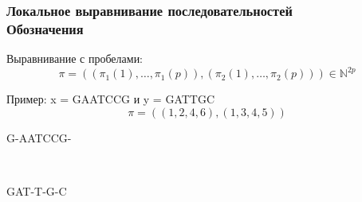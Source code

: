 

\begin{frame}
\frametitle{Локальное выравнивание последовательностей\\
Обозначения}
Выравнивание с пробелами:
\begin{equation*}
    \pi = ((\pi_1(1), \dots, \pi_1(p)),(\pi_2(1), \dots, \pi_2(p)))
    \in \mathbb{N}^{2p}
\end{equation*}

Пример: x = GAATCCG и y = GATTGC
\begin{equation*}
    \pi = ((1,2,4,6),(1,3,4,5))
\end{equation*}
\centerline{G-AATCCG-}\\
\centerline{GAT-T-G-C}
\end{frame}

%
%
%
%
%
%
%


